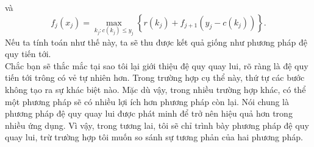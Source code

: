 \documentclass[12pt,a4paper]{article}
\begin{document}
và \[{f_j}\left( {{x_j}} \right) = \mathop {\max }\limits_{{k_j}:c\left( {{k_j}} \right) \leqslant {y_j}} \left\{ {r\left( {{k_j}} \right) + {f_{j + 1}}\left( {{y_j} - c\left( {{k_j}} \right)} \right)} \right\}.\]
Nếu ta tính toán như thế này, ta sẽ thu được kết quả giống như phương pháp đệ quy tiến tới.\\
Chắc bạn sẽ thắc mắc tại sao tôi lại giới thiệu đệ quy quay lui, rõ ràng là đệ quy tiến tới trông có vẻ tự nhiên hơn. Trong trường hợp cụ thể này, thứ tự các bước không tạo ra sự khác biệt nào. Mặc dù vậy, trong nhiều trường hợp khác, có thể một phương pháp sẽ có nhiều lợi ích hơn phương pháp còn lại. Nói chung là phương pháp đệ quy quay lui được phát minh để trở nên hiệu quả hơn trong nhiều ứng dụng. Vì vậy, trong tương lai, tôi sẽ chỉ trình bày phương pháp đệ quy quay lui, trừ trường hợp tôi muốn so sánh sự tương phản của hai phương pháp.
\end{document}
